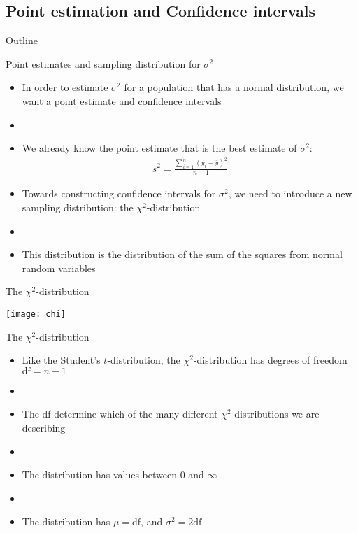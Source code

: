 \documentclass[xcolor=dvipsnames]{beamer}
\begin{document}
\subsection{Point estimation and Confidence intervals}
\begin{frame}{Outline}
	\tableofcontents[currentsection,subsectionstyle=show/shaded/hide]
\end{frame}


\begin{frame}{Point estimates and sampling distribution for $\sigma^2$}
	\begin{itemize}
		\item In order to estimate $\sigma^2$ for a population that has a normal distribution, we want a point estimate and confidence intervals
		\item[]
		\item We already know the point estimate that is the best estimate of $\sigma^2$:
		\begin{gather*}
			s^2=\frac{\sum_{i=1}^{n}(y_i-\bar{y})^2}{n-1}
		\end{gather*}
		\item Towards constructing confidence intervals for $\sigma^2$, we need to introduce a new sampling distribution: the $\chi^2$-distribution 
		\item[]
		\item This distribution is the distribution of the sum of the squares from normal random variables
	\end{itemize}
\end{frame}

\begin{frame}{The  $\chi^2$-distribution}
	\begin{center}
		\texttt{[image: chi]}
	\end{center}
\end{frame}

\begin{frame}{The  $\chi^2$-distribution }
	\begin{itemize}
		\item Like the Student's $t$-distribution, the $\chi^2$-distribution has degrees of freedom $\text{df}=n-1$
		\item[]
		\item The df determine which of the many different $\chi^2$-distributions we are describing
		\item[]
		\item The distribution has values between $0$ and $\infty$
		\item[]
		\item The distribution has $\mu = \text{df}$, and $\sigma^2 = 2\text{df}$
	\end{itemize}
\end{frame}
\end{document}
